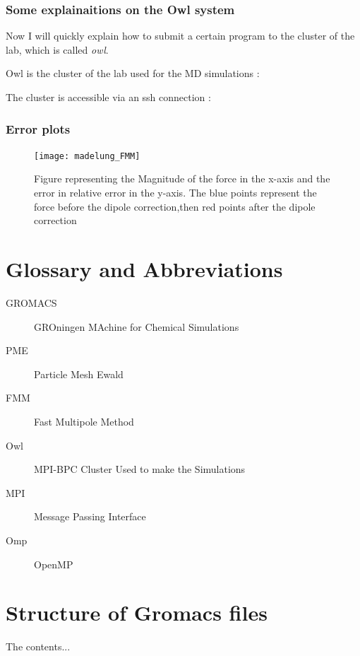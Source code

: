 \documentclass[12pt,twoside,a4paper]{report}
\begin{document}
\subsection{Some explainaitions on the Owl system}

Now I will quickly explain how to submit a certain program to the cluster of the lab, which is called \textit{owl}.

Owl is the cluster of the lab used for the MD simulations : 

The cluster is accessible via an ssh connection : 

\subsection{Error plots}

\begin{figure}[H]
\centering
	\texttt{[image: madelung\_FMM]}
     
    \caption{Figure representing the Magnitude of the force in the x-axis and the  error in relative error in the y-axis. The blue points represent the force before the dipole correction,then red points after the dipole correction}    
   \end{figure}  


\nocite{*}

 

\begin{appendices}
\chapter{Glossary and Abbreviations}

\begin{description}



\item[GROMACS] GROningen MAchine for Chemical Simulations
\item[PME] Particle Mesh Ewald
\item[FMM] Fast Multipole Method
\item[Owl] MPI-BPC Cluster Used to make the Simulations

\item[MPI] Message Passing Interface
\item[Omp] OpenMP

\end{description}


\chapter{Structure of Gromacs files}
The contents...
\end{appendices}
\end{document}
